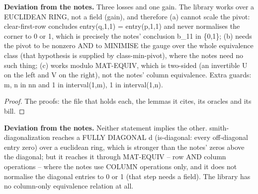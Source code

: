 %
\noindent\textbf{Deviation from the notes.} Three losses and one gain.  The library works over a EUCLIDEAN RING, not a field (gain), and therefore (a) cannot scale the pivot: clear-first-row concludes entry(q,1,1) = entry(p,1,1) and never normalises the corner to 0 or 1, which is precisely the notes' conclusion b\_11 in \{0,1\}; (b) needs the pivot to be nonzero AND to MINIMISE the gauge over the whole equivalence class (that hypothesis is supplied by class-min-pivot), where the notes need no such thing; (c) works modulo MAT-EQUIV, which is two-sided (an invertible U on the left and V on the right), not the notes' column equivalence.  Extra guards: m, n in nn and 1 in interval(1,m), 1 in interval(1,n).
%
\renewcommand{\thethm}{3.10}
\begin{prop}\label{thm:smith-diagonalization}
%
%
\end{prop}
%
\begin{proof}
%
The proofs: the file that holds each, the lemmas it cites, its oracles and its bill.
%
%
%
%
\end{proof}
%
\noindent\textbf{Deviation from the notes.} Neither statement implies the other.  smith-diagonalization reaches a FULLY DIAGONAL d (is-diagonal: every off-diagonal entry zero) over a euclidean ring, which is stronger than the notes' zeros above the diagonal; but it reaches it through MAT-EQUIV -- row AND column operations -- where the notes use COLUMN operations only, and it does not normalise the diagonal entries to 0 or 1 (that step needs a field).  The library has no column-only equivalence relation at all.
